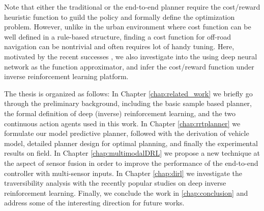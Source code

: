 \documentclass[../thesis.tex]{subfiles}
\begin{document}
Note that either the traditional or the end-to-end planner require the cost/reward heuristic function to guild the policy and formally define the optimization problem. 
However, unlike in the urban environment where cost function can be well defined in a rule-based structure, finding a cost function for off-road navigation can be nontrivial and often requires lot of handy tuning. \cite{silver2010learning}
Here, motivated by the recent successes \cite{wulfmeier2015maximum,wulfmeier2016watch}, we also investigate into the using deep neural network as the function approximator, and infer the cost/reward function under inverse reinforcement learning platform.

The thesis is organized as follows:
In Chapter \ref{chap:related_work} we briefly go through the preliminary background, including the basic sample based planner, the formal definition of deep (inverse) reinforcement learning, and the two continuous action agents used in this work.
In Chapter \ref{chap:rrtplanner} we formulate our model predictive planner, followed with the derivation of vehicle model, detailed planner design for optimal planning, and finally the experimental results on field.
In Chapter \ref{chap:multimodalDRL} we propose a new technique at the aspect of sensor fusion in order to improve the performance of the end-to-end controller with multi-sensor inputs. 
In Chapter \ref{chap:dirl} we investigate the traversibility analysis with the recently popular studies on deep inverse reinforcement learning.
Finally, we conclude the work in \ref{chap:conclusion} and address some of the interesting direction for future works.
\end{document}
